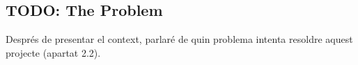 
\subsection{TODO: The Problem}

Després de presentar el context, parlaré de quin problema intenta resoldre
aquest projecte (apartat 2.2).
